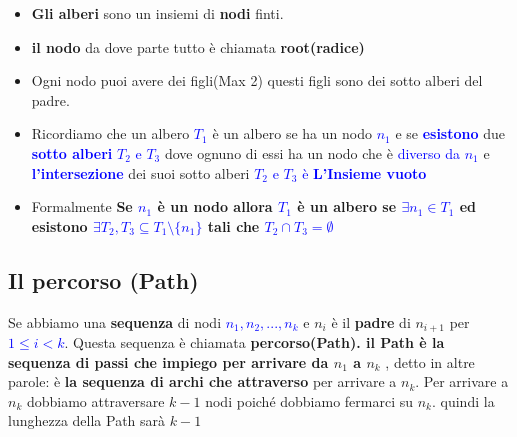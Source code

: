 \begin{itemize}
    \item \textbf{Gli alberi} sono un insiemi di \textbf{nodi} finti. 
    \item \textbf{il nodo} da dove parte tutto è chiamata \textbf{root(radice)}
    \item Ogni nodo puoi avere dei figli(Max 2) questi figli sono dei sotto alberi del padre.
    \item Ricordiamo che un albero \textcolor{blue}{$T_1$} è un albero se ha un nodo \textcolor{blue}{{$n_1$}} e se \textcolor{blue}{\textbf{esistono}} due \textcolor{blue}{\textbf{sotto alberi} $T_2$ e $T_3$} dove ognuno di essi ha un nodo che è \textcolor{blue}{diverso da {$n_1$}} e \textbf{\textcolor{blue}{l'intersezione}} dei suoi sotto alberi \textcolor{blue}{$T_2$ e $T_3$ è \textbf{L'Insieme vuoto}}
    \item Formalmente \textbf{Se \textcolor{blue}{$n_1$} è un nodo allora  \textcolor{blue}{$T_1$} è un albero se \textcolor{blue}{  $\exists n_1 \in T_1$} ed esistono \textcolor{blue}{  $\exists T_2, T_3 \subseteq T_1 \setminus \{n_1\}$} tali che \textcolor{blue}{$T_2 \cap T_3 = \emptyset$}}
\end{itemize}
\subsection{Il percorso (Path)}
Se abbiamo una \textbf{sequenza} di nodi \textcolor{blue}{$n_1, n_2, ..., n_k$} e $n_{i}$ è il \textbf{padre} di $n_{i+1}$ per  \textcolor{blue}{$1 \le i < k$}. Questa sequenza è chiamata \textbf{percorso(Path). il Path è la sequenza di passi che impiego per arrivare da $n_1$ a $n_k$} , detto in altre parole: è \textbf{la sequenza di archi che attraverso} per arrivare a $n_k$. Per arrivare a $n_k$ dobbiamo attraversare $k-1$ nodi poiché dobbiamo fermarci su $n_k$. quindi la lunghezza della Path sarà $k-1$\newline
